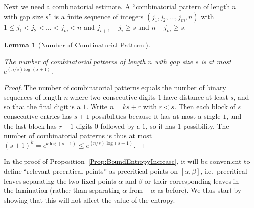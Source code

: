 \documentclass[12pt]{amsart}
\newcommand{\0}{\texttt{0}}
\newcommand{\1}{\texttt{1}}
\newtheorem{lemma}[theorem]{Lemma}
\theoremstyle{definition}
\numberwithin{equation}{section}
\newcommand{\lineclear}{\rule{0pt}{2pt}\newline}
\begin{document}

Next we need a combinatorial estimate. A ``combinatorial pattern of length $n$ with gap size $s$'' is a finite sequence of integers $(j_1,j_2,\dots,j_m,n)$ with $1\le j_1< j_2 < \dots < j_m< n$ and $j_{i+1}-j_i\ge s$ and $n-j_m\ge s$. 


\begin{lemma}[Number of Combinatorial Patterns]
\label{Lem:CombinatorialPatterns} \lineclear
The number of combinatorial patterns of length $n$ with gap size $s$ is at most $e^{(n/s)\log(s+1)}$.
\end{lemma}
\begin{proof}
The number of combinatorial patterns equals the number of binary sequences of length $n$ where two consecutive digits $1$ have distance at least $s$, and so that the final digit is a $1$. Write $n=ks+r$ with $r<s$. Then each block of $s$ consecutive entries has $s+1$ possibilities because it has at most a single $1$, and the last block has $r-1$ digits $0$ followed by a $1$, so it has $1$ possibility. The number of combinatorial patterns is thus at most $(s+1)^k= e^{k\log(s+1)}\le e^{(n/s)\log(s+1)}$.
\end{proof}


In the proof of Proposition~\ref{Prop:BoundEntropyIncrease}, it will be convenient to define ``relevant precritical points'' as precritical points on $[\alpha,\beta]$, i.e.\ precritical leaves separating the two fixed points $\alpha$ and $\beta$ or their corresponding leaves in the lamination (rather than separating $\alpha$ from $-\alpha$ as before). We thus start by showing that this will not affect the value of the entropy.

\end{document}
